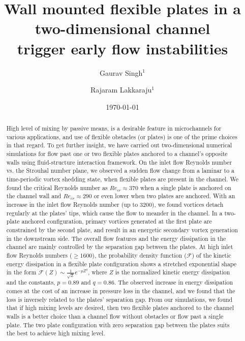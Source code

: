 \documentclass[aps,pre,twocolumn,aps,longbibliography]{revtex4-1}
\begin{document}
	
	
	\title{Wall mounted flexible plates in a two-dimensional channel\\ trigger early flow instabilities}
	
	
	
	\author{Gaurav Singh$^1$}
	\author{Rajaram Lakkaraju$^1$}%
	\date{\today}
	
	\begin{abstract} 
		
		High level of mixing by passive means, is a desirable feature in microchannels for various applications, and use of flexible obstacles (or plates) is one of the prime choices in that regard. To get further insight, we have carried out two-dimensional numerical simulations for flow past one or two flexible plates anchored to a channel's opposite walls using fluid-structure interaction framework. On the inlet flow Reynolds number vs. the Strouhal number plane, we observed a sudden flow change from a laminar to a time-periodic vortex shedding state, when flexible plates are present in the channel. We found the critical Reynolds number as $Re_{cr}\approx 370$ when a single plate is anchored on the channel wall and $Re_{cr}\approx 290$ or even lower when two plates are anchored. With an increase in the inlet flow Reynolds number (up to 3200), we found vortices detach regularly at the plates' tips, which cause the flow to meander in the channel. In a two-plate anchored configuration, primary vortices generated at the first plate are constrained by the second plate, and result in an energetic secondary vortex generation in the downstream side. The overall flow features and the energy dissipation in the channel are mainly controlled by the separation gap between the plates. At high inlet flow Reynolds numbers ($\ge 1600$), the probability density function ($\mathcal{F}$) of the kinetic energy dissipation in a flexible plate configuration shows a stretched exponential shape in the form $\mathcal{F}(Z)\sim{\frac{1}{{\sqrt{Z}}}e^{-pZ^q}}$, where $Z$ is the normalized kinetic energy dissipation and the constants, $p=0.89$ and $q=0.86$. The observed increase in energy dissipation comes at the cost of an increase in pressure loss in the channel, and we found that the loss is inversely related to the plates' separation gap. From our simulations, we found that if high mixing levels are desired, then two flexible plates anchored to the channel walls is a better choice than a channel flow without obstacles or flow past a single plate. The two plate configuration with zero separation gap between the plates suits the best to achieve high mixing level.
		
		
		
	\end{abstract} 
	
\end{document}
